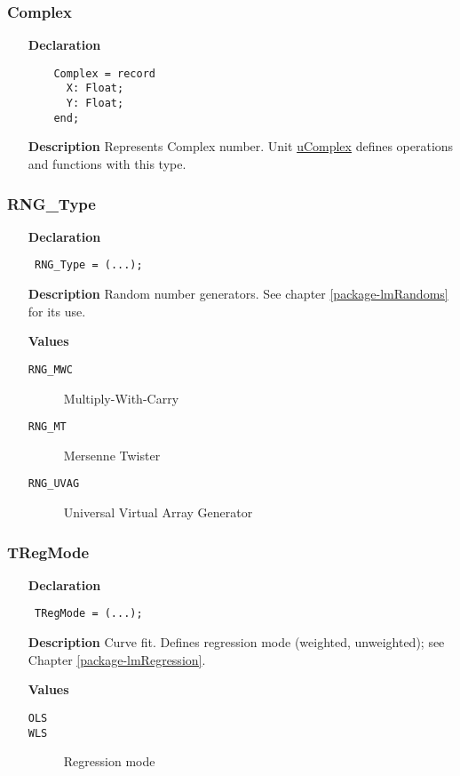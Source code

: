 \documentclass[12pt,a4paper,oneside]{report}
\newcommand{\declarationitem}[1]{\textbf{#1}}
\newcommand{\descriptiontitle}[1]{\textbf{#1}}
\newcommand{\code}[1]{\texttt{#1}}
\begin{document}
\subsubsection{Complex}\label{utypes-complex}
\begin{itemize}
	\item[\declarationitem{Declaration}\hfill]
	\begin{verbatim}
	Complex = record
	  X: Float;
	  Y: Float;
	end;
	\end{verbatim}
	\item[\descriptiontitle{Description}]
Represents Complex number. Unit \hyperref[ucomplex]{uComplex} defines operations and functions with this type.
\end{itemize}
\subsubsection{RNG{\_}Type}
\label{utypes-RNG_Type}
\begin{itemize}\item[\declarationitem{Declaration}\hfill]
	\begin{flushleft}
		\code{
			RNG{\_}Type = (...);}
		
	\end{flushleft}
	
	\par
	\item[\descriptiontitle{Description}]
	Random number generators. See chapter \ref{package-lmRandoms} for its use.
	\item[\textbf{Values}]
	\begin{description}
		\item[\texttt{RNG{\_}MWC}] Multiply{-}With{-}Carry
		\item[\texttt{RNG{\_}MT}] Mersenne Twister
		\item[\texttt{RNG{\_}UVAG}] Universal Virtual Array Generator
	\end{description}
\end{itemize}

\subsubsection{TRegMode}
\label{utypes-TRegMode}
\begin{itemize}\item[\declarationitem{Declaration}\hfill]
	\begin{flushleft}
		\code{
			TRegMode = (...);}
	\end{flushleft}
	\item[\descriptiontitle{Description}]
	Curve fit. Defines regression mode (weighted, unweighted); see Chapter \ref{package-lmRegression}.
	
	\item[\textbf{Values}]
	\begin{description}
		\item[\texttt{OLS}]  
		\item[\texttt{WLS}] Regression mode
	\end{description}
\end{itemize}
\end{document}
